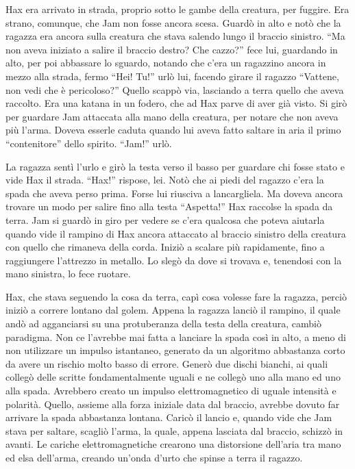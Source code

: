     Hax era arrivato in strada, proprio sotto le gambe della creatura, per
    fuggire. Era strano, comunque, che Jam non fosse ancora scesa. Guardò
    in alto e notò che la ragazza era ancora sulla creatura che stava
    salendo lungo il braccio sinistro. ``Ma non aveva iniziato a salire il
    braccio destro? Che cazzo?'' fece lui, guardando in alto, per poi
    abbassare lo sguardo, notando che c'era un ragazzino ancora in mezzo
    alla strada, fermo ``Hei! Tu!'' urlò lui, facendo girare il ragazzo
    ``Vattene, non vedi che è pericoloso?'' Quello scappò via, lasciando a
    terra quello che aveva raccolto. Era una katana in un fodero, che ad
    Hax parve di aver già visto. Si girò per guardare Jam attaccata alla
    mano della creatura, per notare che non aveva più l'arma. Doveva
    esserle caduta quando lui aveva fatto saltare in aria il primo
    ``contenitore'' dello spirito. ``Jam!'' urlò.

    La ragazza sentì l'urlo e girò la testa verso il basso per guardare chi
    fosse stato e vide Hax il strada. ``Hax!'' rispose, lei. Notò che ai
    piedi del ragazzo c'era la spada che aveva perso prima. Forse lui
    riusciva a lancargliela. Ma doveva ancora trovare un modo per salire
    fino alla testa ``Aspetta!'' Hax raccolse la spada da terra. Jam si
    guardò in giro per vedere se c'era qualcosa che poteva aiutarla quando
    vide il rampino di Hax ancora attaccato al braccio sinistro della
    creatura con quello che rimaneva della corda. Iniziò a scalare più
    rapidamente, fino a raggiungere l'attrezzo in metallo. Lo slegò da dove
    si trovava e, tenendosi con la mano sinistra, lo fece ruotare.

    Hax, che stava seguendo la cosa da terra, capì cosa volesse fare la
    ragazza, perciò iniziò a correre lontano dal golem. Appena la ragazza
    lanciò il rampino, il quale andò ad agganciarsi su una protuberanza
    della testa della creatura, cambiò paradigma. Non ce l'avrebbe mai
    fatta a lanciare la spada così in alto, a meno di non utilizzare un
    impulso istantaneo, generato da un algoritmo abbastanza corto da avere
    un rischio molto basso di errore. Generò due dischi bianchi, ai quali
    collegò delle scritte fondamentalmente uguali e ne collegò uno alla
    mano ed uno alla spada. Avrebbero creato un impulso elettromagnetico
    di uguale intensità e polarità. Quello, assieme alla forza iniziale
    data dal braccio, avrebbe dovuto far arrivare la spada abbastanza
    lontana. Caricò il lancio e, quando vide che Jam stava per saltare,
    scagliò l'arma, la quale, appena lasciata dal braccio, schizzò in
    avanti. Le cariche elettromagnetiche crearono una distorsione dell'aria
    tra mano ed elsa dell'arma, creando un'onda d'urto che spinse a terra
    il ragazzo.

